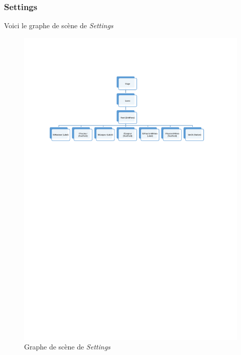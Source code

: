 \documentclass[a4paper, 10pt]{article}
\begin{document}
\subsubsection{Settings}
Voici le graphe de scène de \emph{Settings}
\begin{figure}[H]
\centering
\includegraphics[width=\textwidth]{./gds_settings.pdf}
\caption{Graphe de scène de \emph{Settings}}
\end{figure}
\end{document}

